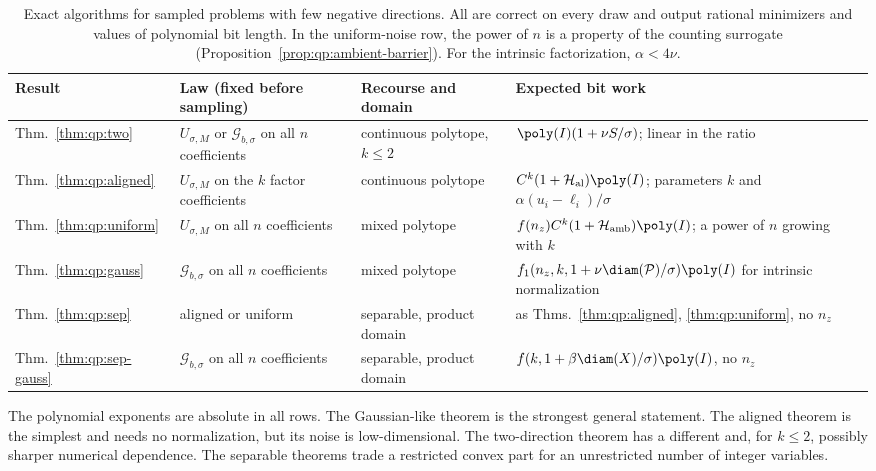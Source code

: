 \begin{table}[ht]
\centering
\small
\begin{tabularx}{\textwidth}{@{}lXXX@{}}
\toprule
Result & Law (fixed before sampling) & Recourse and domain & Expected bit work \\
\midrule
Thm.~\ref{thm:qp:two} & $U_{\sigma,M}$ or $\mathcal G_{b,\sigma}$ on all $n$ coefficients & continuous polytope, $k\le2$ & $\poly(I)(1+\nu S/\sigma)$; linear in the ratio \\
Thm.~\ref{thm:qp:aligned} & $U_{\sigma,M}$ on the $k$ factor coefficients & continuous polytope & $C^k(1+\mathcal H_{\rm al})\poly(I)$; parameters $k$ and $\alpha(u_i-\ell_i)/\sigma$ \\
Thm.~\ref{thm:qp:uniform} & $U_{\sigma,M}$ on all $n$ coefficients & mixed polytope & $f(n_z)C^k(1+\mathcal H_{\rm amb})\poly(I)$; a power of $n$ growing with $k$ \\
Thm.~\ref{thm:qp:gauss} & $\mathcal G_{b,\sigma}$ on all $n$ coefficients & mixed polytope & $f_1(n_z,k,1+\nu\diam(\mathcal P)/\sigma)\poly(I)$ for intrinsic normalization \\
Thm.~\ref{thm:qp:sep} & aligned or uniform & separable, product domain & as Thms.~\ref{thm:qp:aligned}, \ref{thm:qp:uniform}, no $n_z$ \\
Thm.~\ref{thm:qp:sep-gauss} & $\mathcal G_{b,\sigma}$ on all $n$ coefficients & separable, product domain & $f(k,1+\beta\diam(X)/\sigma)\poly(I)$, no $n_z$ \\
\bottomrule
\end{tabularx}
\caption{Exact algorithms for sampled problems with few negative directions.
All are correct on every draw and output rational minimizers and values of
polynomial bit length. In the uniform-noise row, the power of $n$ is a property
of the counting surrogate (Proposition~\ref{prop:qp:ambient-barrier}). For the
intrinsic factorization, $\alpha<4\nu$.}
\label{tab:qp:regimes}
\end{table}

The polynomial exponents are absolute in all rows. The Gaussian-like theorem
is the strongest general statement. The aligned theorem is the simplest and
needs no normalization, but its noise is low-dimensional. The two-direction
theorem has a different and, for $k\le2$, possibly sharper numerical
dependence. The separable theorems trade a restricted convex part for an
unrestricted number of integer variables.
